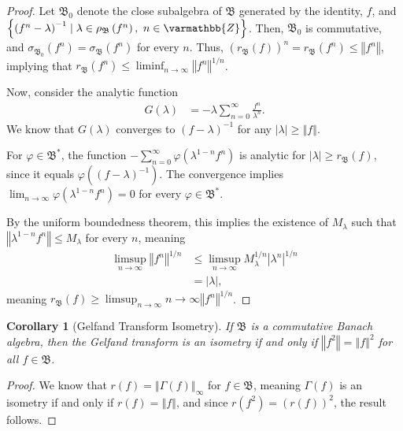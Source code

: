 \documentclass[10pt]{extarticle}
\newcommand{\Z}{\mathbb{Z}}
\newcommand{\norm}[1]{\left\Vert #1\right\Vert}
\newcommand{\set}[1]{\left\{#1\right\}}
\theoremstyle{plain}
\newtheorem*{corollary}{Corollary}
\theoremstyle{definition}
\theoremstyle{note}
\renewcommand*{\mathbb}[1]{\varmathbb{#1}}
\renewcommand{\newline}{\hfill\break}
\begin{document}
\begin{proof}
  Let $\mathfrak{B}_0$ denote the close subalgebra of $\mathfrak{B}$ generated by the identity, $f$, and $\set{\left(f^n - \lambda\right)^{-1}\mid \lambda \in \rho_{\mathfrak{B}}\left(f^n\right),~n\in \Z}$. Then, $\mathfrak{B}_0$ is commutative, and $\sigma_{\mathfrak{B}_0}\left(f^n\right) = \sigma_{\mathfrak{B}}\left(f^n\right)$ for every $n$. Thus, $\left(r_{\mathfrak{B}}\left(f\right)\right)^n = r_{\mathfrak{B}}\left(f^n\right) \leq \norm{f^n}$, implying that $r_{\mathfrak{B}}\left(f^n\right) \leq \liminf_{n\rightarrow\infty}\norm{f^n}^{1/n}$.\newline

  Now, consider the analytic function
  \begin{align*}
    G\left(\lambda\right) &= -\lambda\sum_{n=0}^{\infty}\frac{f^n}{\lambda^n}.
  \end{align*}
  We know that $G(\lambda)$ converges to $\left(f-\lambda\right)^{-1}$ for any $|\lambda| \geq \norm{f}$.\newline

  For $\varphi \in \mathfrak{B}^{\ast}$, the function $-\sum_{n=0}^{\infty}\varphi\left(\lambda^{1-n}f^n\right)$ is analytic for $|\lambda| \geq r_{\mathfrak{B}}\left(f\right)$, since it equals $\varphi\left(\left(f-\lambda\right)^{-1}\right)$. The convergence implies $\lim_{n\rightarrow\infty}\varphi\left(\lambda^{1-n}f^n\right)= 0$ for every $\varphi\in \mathfrak{B}^{\ast}$.\newline

  By the uniform boundedness theorem, this implies the existence of $M_{\lambda}$ such that $\norm{\lambda^{1-n}f^n}\leq M_{\lambda}$ for every $n$, meaning
  \begin{align*}
    \limsup_{n\rightarrow\infty}\norm{f^n}^{1/n} &\leq \limsup_{n\rightarrow\infty}M_{\lambda}^{1/n}\left\vert \lambda^{n} \right\vert^{1/n}\\
                                                 &= |\lambda|,
  \end{align*}
  meaning $r_{\mathfrak{B}}\left(f\right) \geq \limsup_{n\rightarrow\infty}{n\rightarrow\infty}\norm{f^n}^{1/n}$.
\end{proof}
\begin{corollary}[Gelfand Transform Isometry]
  If $\mathfrak{B}$ is a commutative Banach algebra, then the Gelfand transform is an isometry if and only if $\norm{f^2} = \norm{f}^2$ for all $f\in \mathfrak{B}$.
\end{corollary}
\begin{proof}
  We know that $r(f) = \norm{\Gamma(f)}_{\infty}$ for $f\in \mathfrak{B}$, meaning $\Gamma(f)$ is an isometry if and only if $r(f) = \norm{f}$, and since $r\left(f^2\right) = \left(r(f)\right)^2$, the result follows.
\end{proof}
\end{document}
